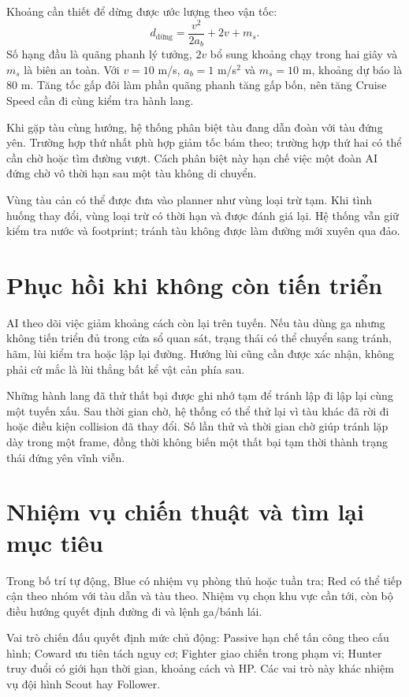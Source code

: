\documentclass[11pt,a4paper,oneside]{report}
\begin{document}
Khoảng cần thiết để dừng được ước lượng theo vận tốc:
\begin{equation}
 d_{\text{dừng}}=\frac{v^2}{2a_b}+2v+m_s.
\end{equation}
Số hạng đầu là quãng phanh lý tưởng, $2v$ bổ sung khoảng chạy trong hai giây và $m_s$ là biên an toàn. Với $v=10$ m/s, $a_b=1$ m/s$^2$ và $m_s=10$ m, khoảng dự báo là 80 m. Tăng tốc gấp đôi làm phần quãng phanh tăng gấp bốn, nên tăng Cruise Speed cần đi cùng kiểm tra hành lang.

Khi gặp tàu cùng hướng, hệ thống phân biệt tàu đang dẫn đoàn với tàu đứng yên. Trường hợp thứ nhất phù hợp giảm tốc bám theo; trường hợp thứ hai có thể cần chờ hoặc tìm đường vượt. Cách phân biệt này hạn chế việc một đoàn AI đứng chờ vô thời hạn sau một tàu không di chuyển.

Vùng tàu cản có thể được đưa vào planner như vùng loại trừ tạm. Khi tình huống thay đổi, vùng loại trừ có thời hạn và được đánh giá lại. Hệ thống vẫn giữ kiểm tra nước và footprint; tránh tàu không được làm đường mới xuyên qua đảo.

\section{Phục hồi khi không còn tiến triển}
AI theo dõi việc giảm khoảng cách còn lại trên tuyến. Nếu tàu dùng ga nhưng không tiến triển đủ trong cửa sổ quan sát, trạng thái có thể chuyển sang tránh, hãm, lùi kiểm tra hoặc lập lại đường. Hướng lùi cũng cần được xác nhận, không phải cứ mắc là lùi thẳng bất kể vật cản phía sau.

Những hành lang đã thử thất bại được ghi nhớ tạm để tránh lập đi lập lại cùng một tuyến xấu. Sau thời gian chờ, hệ thống có thể thử lại vì tàu khác đã rời đi hoặc điều kiện collision đã thay đổi. Số lần thử và thời gian chờ giúp tránh lặp dày trong một frame, đồng thời không biến một thất bại tạm thời thành trạng thái đứng yên vĩnh viễn.


\section{Nhiệm vụ chiến thuật và tìm lại mục tiêu}
Trong bố trí tự động, Blue có nhiệm vụ phòng thủ hoặc tuần tra; Red có thể tiếp cận theo nhóm với tàu dẫn và tàu theo. Nhiệm vụ chọn khu vực cần tới, còn bộ điều hướng quyết định đường đi và lệnh ga/bánh lái.

Vai trò chiến đấu quyết định mức chủ động: Passive hạn chế tấn công theo cấu hình; Coward ưu tiên tách nguy cơ; Fighter giao chiến trong phạm vi; Hunter truy đuổi có giới hạn thời gian, khoảng cách và HP. Các vai trò này khác nhiệm vụ đội hình Scout hay Follower.
\end{document}
